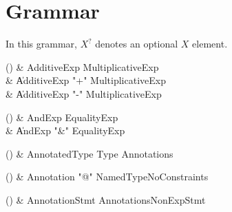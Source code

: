 \chapter{Grammar}\label{Grammar}


In this grammar, $X^?$ denotes an optional $X$ element.


\begin{bbgrammarappendix}{3.9in}

() & AdditiveExp \label{prod:AdditiveExp}  \: MultiplicativeExp  \\

 &    \| AdditiveExp \xcd"+" MultiplicativeExp \\
 &    \| AdditiveExp \xcd"-" MultiplicativeExp \\

\end{bbgrammarappendix}

\begin{bbgrammarappendix}{4.4in}

() & AndExp \label{prod:AndExp}  \: EqualityExp  \\

 &    \| AndExp \xcd"&" EqualityExp \\

\end{bbgrammarappendix}

\begin{bbgrammarappendix}{3.7in}

() & AnnotatedType \label{prod:AnnotatedType}  \: Type Annotations  \\


\end{bbgrammarappendix}

\begin{bbgrammarappendix}{4.0in}

() & Annotation \label{prod:Annotation}  \: \xcd"@" NamedTypeNoConstraints  \\


\end{bbgrammarappendix}

\begin{bbgrammarappendix}{3.6in}

() & AnnotationStmt \label{prod:AnnotationStmt}  \: Annotations\opt NonExpStmt  \\


\end{bbgrammarappendix}

